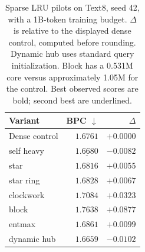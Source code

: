 \begin{table}[H]
\centering
\caption{Sparse LRU pilots on Text8, seed 42, with a 1B-token training budget. $\Delta$ is relative to the displayed dense control, computed before rounding. Dynamic hub uses standard query initialization. Block has a 0.531M core versus approximately 1.05M for the control. Best observed scores are bold; second best are underlined.}
\label{tab:sparselru}
\begin{tabular}{lrr}
\toprule
Variant & BPC $\downarrow$ & $\Delta$ \\
\midrule
Dense control & $1.6761$ & $+0.0000$ \\
self heavy & $\underline{1.6680}$ & $-0.0082$ \\
star & $1.6816$ & $+0.0055$ \\
star ring & $1.6828$ & $+0.0067$ \\
clockwork & $1.7084$ & $+0.0323$ \\
block & $1.7638$ & $+0.0877$ \\
entmax & $1.6861$ & $+0.0099$ \\
dynamic hub & $\mathbf{1.6659}$ & $-0.0102$ \\
\bottomrule
\end{tabular}
\end{table}
